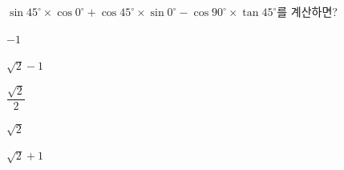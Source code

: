 $\sin 45^\circ\times\cos 0^\circ+\cos 45^\circ\times\sin 0^\circ-\cos 90^\circ\times\tan 45^\circ$를 계산하면?
\begin{choices32}{\rule[-3ex]{0pt}{8ex}$-1$}{\rule[-3ex]{0pt}{8ex}$\sqrt{2}-1$}{\rule[-3ex]{0pt}{8ex}$\dfrac{\sqrt{2}}{2}$}{\rule[-3ex]{0pt}{8ex}$\sqrt{2}$}{\rule[-3ex]{0pt}{8ex}$\sqrt{2}+1$}\end{choices32}
